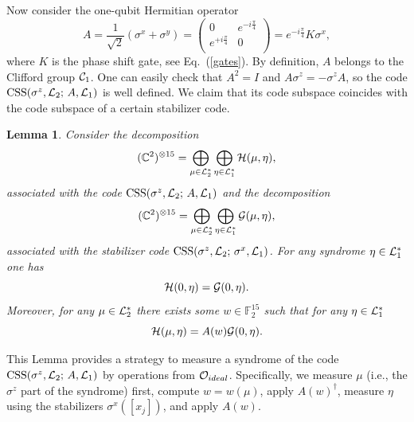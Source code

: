 \documentclass[pra,twocolumn,showpacs]{revtex4}
\newtheorem{lemma}{Lemma}
\newcommand{\CC}{\mathbb{C}}
\newcommand{\FF}{\mathbb{F}}
\newcommand{\calL}{{\cal L }}
\newcommand{\calH}{{\cal H }}
\newcommand{\calG}{{\cal G }}
\newcommand{\calO}{{\cal O }}
\newcommand*{\Cl}[1]{{\cal C}_{#1}}
\newcommand{\sx}{\sigma^x}
\newcommand{\sy}{\sigma^y}
\newcommand{\sz}{\sigma^z}
\newcommand{\ba}{\begin{array}}
\newcommand{\ea}{\end{array}}
\DeclareMathOperator*{\CSS}{\mathop{\mathrm{CSS}}}
\begin{document}
Now consider the one-qubit Hermitian operator
\[
A=\frac1{\sqrt{2}} (\sx+\sy) = \left( \ba{cc} 0 & e^{-i\frac{\pi}4} \\
e^{+i\frac{\pi}4} & 0 \\ \ea \right)=
e^{-i\frac{\pi}4} K\sx,
\]
where $K$ is the phase shift gate, see Eq.~(\ref{gates}). By definition, $A$
belongs to the Clifford group $\Cl{1}$.  One can easily check that $A^2=I$ and
$A\sz = -\sz A$, so the code $\CSS(\sz, \calL_2;\, A, \calL_1)$ is well
defined.  We claim that its code subspace coincides with the code subspace of
a certain stabilizer code.
\begin{lemma}\label{lemma:CSS=CSS}
Consider the decomposition
\[
(\CC^2)^{\otimes 15}=\bigoplus_{\mu\in \calL_2^*}\bigoplus_{\eta\in \calL_1^*}
\calH(\mu,\eta),
\]
associated with the code $\CSS(\sz,\calL_2; \, A, \calL_1)$ and the
decomposition
\[
(\CC^2)^{\otimes 15}=\bigoplus_{\mu\in \calL_2^*}\bigoplus_{\eta\in \calL_1^*}
\calG(\mu,\eta),
\]
associated with the stabilizer code $\CSS(\sz,\calL_2; \, \sx, \calL_1)$. For
any syndrome $\eta\in \calL_1^*$ one has
\[
\calH(0,\eta)=\calG(0,\eta).
\]
Moreover, for any $\mu\in\calL_2^*$ there exists some $w\in\FF_{2}^{15}$ such
that for any $\eta\in \calL_1^*$
\begin{equation}\label{rotated_code}
\calH(\mu,\eta)=A(w)\calG(0,\eta).
\end{equation}
\end{lemma}
This Lemma provides a strategy to measure a syndrome of the code
$\CSS(\sz,\calL_2; \, A, \calL_1)$ by operations from
$\calO_{ideal}$. Specifically, we measure $\mu$ (i.e., the $\sigma^{z}$ part
of the syndrome) first, compute $w=w(\mu)$, apply $A(w)^{\dag}$, measure
$\eta$ using the stabilizers $\sigma^{x}([x_{j}])$, and apply $A(w)$.
\end{document}
